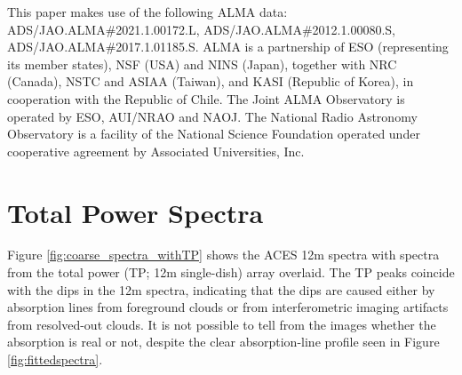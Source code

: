 \documentclass[]{aastex631}
\newcommand{\kms}{\ensuremath{\mathrm{km~s}^{-1}}\xspace}
\begin{document}
This paper makes use of the following ALMA data: ADS/JAO.ALMA\#2021.1.00172.L, ADS/JAO.ALMA\#2012.1.00080.S, ADS/JAO.ALMA\#2017.1.01185.S. ALMA is a partnership of ESO (representing its member states), NSF (USA) and NINS (Japan), together with NRC (Canada), NSTC and ASIAA (Taiwan), and KASI (Republic of Korea), in cooperation with the Republic of Chile. The Joint ALMA Observatory is operated by ESO, AUI/NRAO and NAOJ.
The National Radio Astronomy Observatory is a facility of the National Science Foundation operated under cooperative agreement by Associated Universities, Inc.





\clearpage
\appendix
\section{Total Power Spectra}
\label{appendix:totalpowerspectra}
Figure \ref{fig:coarse_spectra_withTP} shows the ACES 12m spectra with spectra from the total power (TP; 12m single-dish) array overlaid.
The TP peaks coincide with the dips in the 12m spectra, indicating that the dips are caused either by absorption lines from foreground clouds or from interferometric imaging artifacts from resolved-out clouds.
It is not possible to tell from the images whether the absorption is real or not, despite the clear absorption-line profile seen in Figure \ref{fig:fittedspectra}.
\end{document}
